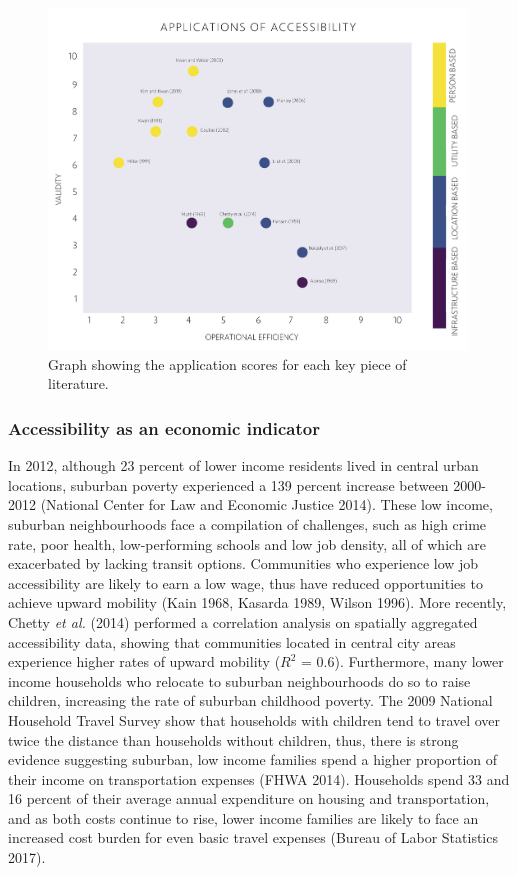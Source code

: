 \documentclass[a4paper,UKenglish]{lipics-v2018}
\begin{document}
\begin{figure}[ht]
    \centering
    \includegraphics[width=0.99\textwidth]{Literature_review/Applications.pdf}
    \caption[Application scatterplot]{Graph showing the application scores for each key piece of literature.} 
    \label{fig:Applications}
\end{figure}

\subsubsection{Accessibility as an economic indicator}
In 2012, although 23 percent of lower income residents lived in central urban locations, suburban poverty experienced a 139 percent increase between 2000-2012 (National Center for Law and Economic Justice 2014). These low income, suburban neighbourhoods face a compilation of challenges, such as high crime rate, poor health, low-performing schools and low job density, all of which are exacerbated by lacking transit options. Communities who experience low job accessibility are likely to earn a low wage, thus have reduced opportunities to achieve upward mobility (Kain 1968, Kasarda 1989, Wilson 1996). More recently, Chetty \textit{et al.} (2014) performed a correlation analysis on spatially aggregated accessibility data, showing that communities located in central city areas experience higher rates of upward mobility (\(R^2\) = 0.6). Furthermore, many lower income households who relocate to suburban neighbourhoods do so to raise children, increasing the rate of suburban childhood poverty. The 2009 National Household Travel Survey show that households with children tend to travel over twice the distance than households without children, thus, there is strong evidence suggesting suburban, low income families spend a higher proportion of their income on transportation expenses (FHWA 2014). Households spend 33 and 16 percent of their average annual expenditure on housing and transportation, and as both costs continue to rise, lower income families are likely to face an increased cost burden for even basic travel expenses (Bureau of Labor Statistics 2017). 
\end{document}
